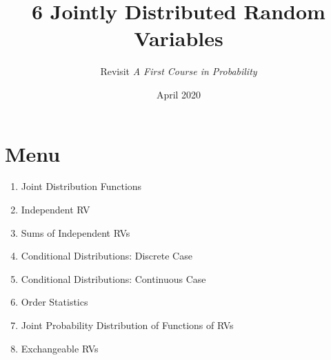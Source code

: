 \documentclass{article}
\title{6 Jointly Distributed Random Variables}
\author{Revisit \emph{A First Course in Probability}}
\date{April 2020}
\begin{document}
\maketitle

\section*{Menu}
\begin{enumerate}
\item  Joint Distribution Functions 
\item  Independent RV
\item  Sums of Independent RVs
\item  Conditional Distributions: Discrete Case 
\item  Conditional Distributions: Continuous Case 
\item  Order Statistics
\item  Joint Probability Distribution of Functions of RVs
\item  Exchangeable RVs
\end{enumerate}
\end{document}
